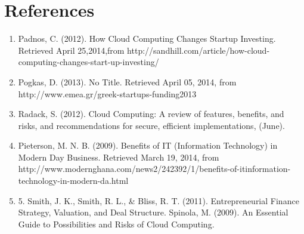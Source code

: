 \documentclass[notitlepage]{report}
\begin{document}
\section*{References}

\begin{enumerate}

\item Padnos, C. (2012). How Cloud Computing Changes Startup Investing. Retrieved April 25,2014,from  http://sandhill.com/article/how-cloud-computing-changes-start-up-investing/

\item Pogkas, D. (2013). No Title. Retrieved April 05, 2014, from http://www.emea.gr/greek-startups-funding2013

\item Radack, S. (2012). Cloud Computing: A review of features, benefits, and risks, and recommendations for secure, efficient implementations, (June). 

\item Pieterson, M. N. B. (2009). Benefits of IT (Information Technology) in Modern Day Business. Retrieved March 19, 2014, from http://www.modernghana.com/news2/242392/1/benefits-of-itinformation-technology-in-modern-da.html 

\item 5.	Smith, J. K., Smith, R. L., & Bliss, R. T. (2011). Entrepreneurial Finance Strategy, Valuation, and Deal Structure. Spinola, M. (2009). An Essential Guide to Possibilities and Risks of Cloud Computing.

\end{enumerate}
\end{document}
